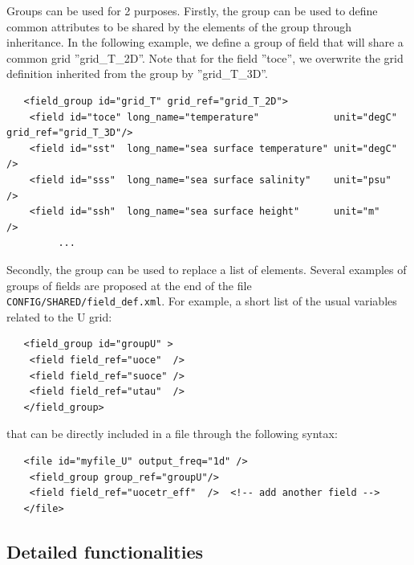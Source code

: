 Groups can be used for 2 purposes. Firstly, the group can be used to define common attributes to be shared by the elements of the group through inheritance. In the following example, we define a group of field that will share a common grid ''grid\_T\_2D''. Note that for the field ''toce'', we overwrite the grid definition inherited from the group by ''grid\_T\_3D''.
\vspace{-20pt}
\begin{alltt}  {{\scriptsize
\begin{verbatim}
   <field_group id="grid_T" grid_ref="grid_T_2D">
    <field id="toce" long_name="temperature"             unit="degC" grid_ref="grid_T_3D"/>
    <field id="sst"  long_name="sea surface temperature" unit="degC"                     />
    <field id="sss"  long_name="sea surface salinity"    unit="psu"                      />
    <field id="ssh"  long_name="sea surface height"      unit="m"                        />
         ...
\end{verbatim}
}}\end{alltt} 

Secondly, the group can be used to replace a list of elements. Several examples of groups of fields are proposed at the end of the file {\tt CONFIG/SHARED/field\_def.xml}. For example, a short list of the usual variables related to the U grid:
\vspace{-20pt}
\begin{alltt}  {{\scriptsize
\begin{verbatim}
   <field_group id="groupU" >
    <field field_ref="uoce"  />
    <field field_ref="suoce" />
    <field field_ref="utau"  />
   </field_group>
\end{verbatim}
}}\end{alltt} 
that can be directly included in a file through the following syntax:
\vspace{-20pt}
\begin{alltt}  {{\scriptsize
\begin{verbatim}
   <file id="myfile_U" output_freq="1d" />   
    <field_group group_ref="groupU"/>  
    <field field_ref="uocetr_eff"  />  <!-- add another field -->
   </file>   
\end{verbatim}
}}\end{alltt} 

\subsection{Detailed functionalities }

